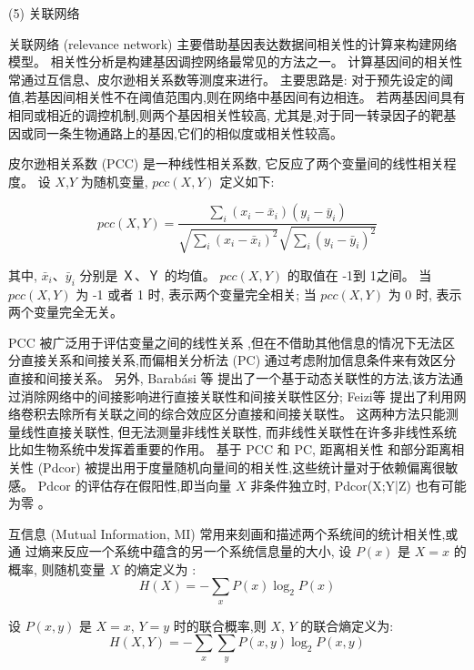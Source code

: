(5) 关联网络

关联网络 (relevance network) 主要借助基因表达数据间相关性的计算来构建网络模型。
相关性分析是构建基因调控网络最常见的方法之一。
计算基因间的相关性常通过互信息、皮尔逊相关系数等测度来进行。
主要思路是: 对于预先设定的阈值,若基因间相关性不在阈值范围内,则在网络中基因间有边相连。
若两基因间具有相同或相近的调控机制,则两个基因相关性较高,
尤其是,对于同一转录因子的靶基因或同一条生物通路上的基因,它们的相似度或相关性较高。

皮尔逊相关系数 (PCC) 是一种线性相关系数, 它反应了两个变量间的线性相关程度。
设 $X$,$Y$ 为随机变量, $pcc(X,Y)$ 定义如下:

\begin{equation}
pcc(X,Y) = \frac{{\sum\limits_i {(x_i -\bar x_i )(y_i -\bar y_i )} }}{{\sqrt {\sum\limits_i {(x_i  - \bar x_i )^2 } } \sqrt {\sum\limits_i {(y_i  - \bar y_i )^2 } } }}
\end{equation}

其中, $\bar x_i$、$\bar y_i$ 分别是 Ｘ、Ｙ 的均值。
 $pcc(X,Y)$ 的取值在 -1到 1之间。
当 $pcc(X,Y)$ 为 -1 或者 1 时, 表示两个变量完全相关;
当 $pcc(X,Y)$ 为 0 时, 表示两个变量完全无关。

PCC 被广泛用于评估变量之间的线性关系 ,但在不借助其他信息的情况下无法区分直接关系和间接关系,而偏相关分析法 (PC)  通过考虑附加信息条件来有效区分直接和间接关系。
另外, Barabási 等  提出了一个基于动态关联性的方法,该方法通过消除网络中的间接影响进行直接关联性和间接关联性区分; 
Feizi等  提出了利用网络卷积去除所有关联之间的综合效应区分直接和间接关联性。
这两种方法只能测量线性直接关联性,
但无法测量非线性关联性, 而非线性关联性在许多非线性系统比如生物系统中发挥着重要的作用。
基于 PCC 和 PC, 距离相关性  和部分距离相关性 (Pdcor)  被提出用于度量随机向量间的相关性,这些统计量对于依赖偏离很敏感。
Pdcor 的评估存在假阳性,即当向量 $X$ 非条件独立时, Pdcor(X;Y|Z) 也有可能为零 。

互信息 (Mutual Information, MI) 常用来刻画和描述两个系统间的统计相关性,或通
过熵来反应一个系统中蕴含的另一个系统信息量的大小, 设 $P(x)$ 是 $X=x$ 的概率,
则随机变量 $X$ 的熵定义为 :
\begin{equation}
    H(X) = - \sum\limits_x {P(x)\log _2 P(x)} 
\end{equation}

设 $P(x,y)$ 是 $X=x$, $Y=y$ 时的联合概率,则 $X$, $Y$ 的联合熵定义为:
\begin{equation}
    H(X,Y) =  - \sum\limits_x {\sum\limits_y {P(x,y)\log _2 P(x,y)} } 
\end{equation}


